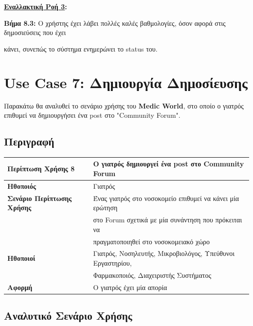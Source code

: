 \documentclass{article}
\newcommand\T{\rule{0pt}{2.6ex}}       %
\newcommand\B{\rule[-1.2ex]{0pt}{0pt}}
\begin{document}
\textbf{\underline{Εναλλακτική Ροή 3}:} \vspace{0.2cm}
\par \textbf{Βήμα 8.3:} Ο χρήστης έχει λάβει πολλές καλές βαθμολογίες, όσον αφορά στις δημοσιεύσεις που έχει \par κάνει, συνεπώς το σύστημα ενημερώνει το status του.

\section{Use Case 7: Δημιουργία Δημοσίευσης}

Παρακάτω θα αναλυθεί το σενάριο χρήσης του \textbf{Medic World}, στο οποίο ο γιατρός επιθυμεί να δημιουργήσει ένα post στο "Community Forum".

\subsection{Περιγραφή}

\begin{center}
     \begin{tabular}{|l|l|}
     \hline
      \textbf{Περίπτωση Χρήσης 8} & Ο γιατρός δημιουργεί ένα post στο Community Forum \T\B \\ 
      \hline
      \textbf{Ηθοποιός} & Γιατρός \T\B \\
      \hline
      \textbf{Σενάριο Περίπτωσης Χρήσης} & Ένας γιατρός στο νοσοκομείο επιθυμεί να κάνει μία ερώτηση \T \\& στο Forum σχετικά με μία συνάντηση που πρόκειται να \\& πραγματοποιηθεί στο νοσοκομειακό χώρο \B \\
      \hline
      \textbf{Ηθοποιοί} & Γιατρός, Νοσηλευτής, Μικροβιολόγος, Υπεύθυνοι Εργαστηρίου, \T \\& Φαρμακοποιός, Διαχειριστής Συστήματος \B \\
      \hline
      \textbf{Αφορμή} &  Ο γιατρός έχει μία απορία\T\B \\
      \hline
     \end{tabular}
 \end{center}
 
 \newpage
 
 \subsection{Αναλυτικό Σενάριο Χρήσης}
\end{document}
